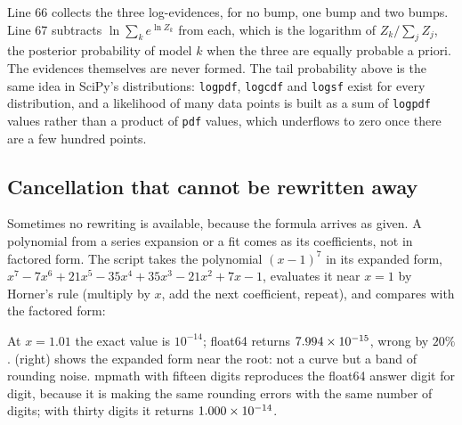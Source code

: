 
Line 66 collects the three log-evidences, for no bump, one bump and two bumps. Line 67 subtracts $\ln\sum_ke^{\ln Z_k}$ from each, which is the logarithm of $Z_k/\sum_jZ_j$, the posterior probability of model $k$ when the three are equally probable a priori. The evidences themselves are never formed. The tail probability above is the same idea in SciPy's distributions: \texttt{logpdf}, \texttt{logcdf} and \texttt{logsf} exist for every distribution, and a likelihood of many data points is built as a sum of \texttt{logpdf} values rather than a product of \texttt{pdf} values, which underflows to zero once there are a few hundred points.

\subsection{Cancellation that cannot be rewritten away}
\label{T0a:sec:mp-cancel}

Sometimes no rewriting is available, because the formula arrives as given. A polynomial from a series expansion or a fit comes as its coefficients, not in factored form. The script takes the polynomial $(x-1)^7$ in its expanded form, $x^7-7x^6+21x^5-35x^4+35x^3-21x^2+7x-1$, evaluates it near $x=1$ by Horner's rule (multiply by $x$, add the next coefficient, repeat), and compares with the factored form:


At $x=1.01$ the exact value is $10^{-14}$; float64 returns $7.994\times10^{-15}$, wrong by $20\%$.  (right) shows the expanded form near the root: not a curve but a band of rounding noise. mpmath with fifteen digits reproduces the float64 answer digit for digit, because it is making the same rounding errors with the same number of digits; with thirty digits it returns $1.000\times10^{-14}$.

